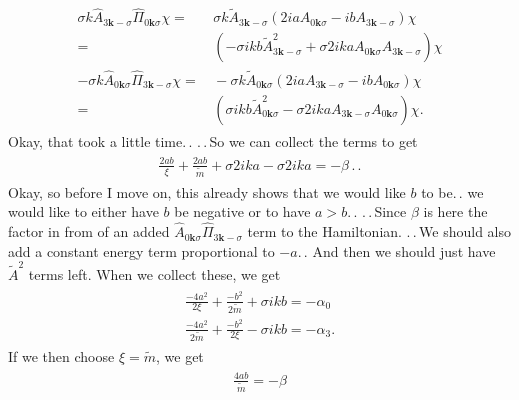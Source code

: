 \documentclass{report}
\begin{document}
\begin{align}
\begin{aligned}
	\sigma k \hat{A}_{3 \boldsymbol k -\sigma} \hat \Pi_{0 \boldsymbol k \sigma} 
	\chi =&\,
	\sigma k \tilde A_{3\boldsymbol{k}-\sigma} (
		2 i a A_{0\boldsymbol{k}\sigma} -
		i b A_{3\boldsymbol{k}-\sigma}
	) \chi \\=&\,
	(
		-\sigma i k b \tilde A_{3\boldsymbol{k}-\sigma}^2 +
		\sigma 2 i k a A_{0\boldsymbol{k}\sigma} A_{3\boldsymbol{k}-\sigma}
	) \chi \\
	- \sigma k \hat{A}_{0 \boldsymbol k \sigma} \hat \Pi_{3 \boldsymbol k -\sigma} 
	\chi =&\,
	-\sigma k \tilde A_{0\boldsymbol{k}\sigma} (
		2 i a A_{3\boldsymbol{k}-\sigma} -
		i b A_{0\boldsymbol{k}\sigma}
	) \chi \\=&\,
	(
		\sigma i k b \tilde A_{0\boldsymbol{k}\sigma}^2 -
		\sigma 2 i k a A_{3\boldsymbol{k}-\sigma} A_{0\boldsymbol{k}\sigma}
	) \chi.
\end{aligned}
\end{align}
Okay, that took a little time.\,. .\,.\,So we can collect the terms to get
\begin{align}
\begin{aligned}
	\frac{2 a b}{\xi} + \frac{2 a b}{\tilde m} + \sigma 2 i k a - \sigma 2 i k a = -\beta\,.\,.
\end{aligned}
\end{align}
Okay, so before I move on, this already shows that we would like $b$ to be.\,. we would like to either have $b$ be negative or to have $a> b$.\,. .\,.\,Since $\beta$ is here the factor in from of an added $\hat{A}_{0 \boldsymbol k \sigma} \hat \Pi_{3 \boldsymbol k -\sigma}$ term to the Hamiltonian. .\,.\,We should also add a constant energy term proportional to $-a$.\,. And then we should just have $\tilde A^2$ terms left. When we collect these, we get
\begin{align}
\begin{aligned}
	\frac{-4 a^2}{2\xi} + \frac{-b^2}{2 \tilde m} + \sigma  i k b = -\alpha_0\\
	\frac{-4 a^2}{2\tilde m} + \frac{-b^2}{2 \xi} - \sigma  i k b = -\alpha_3.
\end{aligned}
\end{align}
If we then choose $\xi = \tilde m$, we get
\begin{align}
\begin{aligned}
	\frac{4 a b}{\tilde m} = -\beta\\
\end{aligned}
\end{align}
\end{document}
